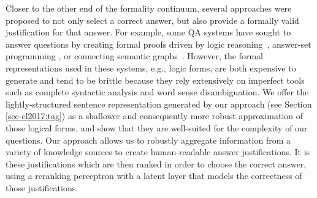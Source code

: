 Closer to the other end of the formality continuum, several approaches were proposed to not only select a correct answer, but also provide a formally valid justification for that answer.  For example, some QA systems have sought to answer questions by creating formal proofs driven by logic reasoning~\cite{moldovan2003cogex,moldovan2007cogex,balduccini2008knowledge,maccartney2009natural,liang2013learning,lewis2013combining}, answer-set programming \cite{baral2006using,baral2011towards,baral2012answering,baral2012knowledge}, or connecting semantic graphs~\cite{banarescu2012amr,sharmatowards}. 
However, the formal representations used in these systems, e.g., logic forms, are both expensive to generate 
and tend to be brittle because they rely extensively on imperfect tools such as complete syntactic analysis and word sense disambiguation.
We offer the lightly-structured sentence representation generated by our approach (see Section \ref{sec-cl2017:tag}) as a shallower and consequently more robust approximation of those logical forms, and show that they are well-suited for the complexity of our questions.
Our approach allows us to robustly aggregate information from a variety of knowledge sources to create human-readable answer justifications.  
It is these justifications which are then ranked in order to choose the correct answer, using a reranking perceptron with a latent layer that models the correctness of those justifications.


